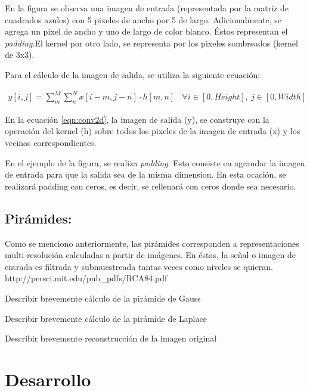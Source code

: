 \par En la figura se observa una imagen de entrada (representada por la matriz de cuadrados azules) con 5 pixeles de ancho por 5 de largo. Adicionalmente, se agrega un pixel de ancho y uno de largo de color blanco. Éstos representan el \textit{padding}.El kernel por otro lado, se representa por los pixeles sombreados (kernel de 3x3).

\par Para el cálculo de la imagen de salida, se utiliza la siguiente ecuación:

\begin{align}
  y[i,j] = \sum_{m}^{M} \sum_{n}^{N} x[i-m, j-n] \cdot h[m,n] \: \: \: \: \forall i \in [0,Height], \: j \in [0,Width]
  \label{eqn:conv2d}
\end{align}

\par En la ecuación \ref{eqn:conv2d}, la imagen de salida (y), se construye con la operación del kernel (h) sobre todos los pixeles de la imagen de entrada (x) y los vecinos correspondientes.

\par En el ejemplo de la figura, se realiza \textit{padding}. Esto consiste en agrandar la imagen de entrada para que la salida sea de la misma dimension. En esta ocación, se realizará padding con ceros, es decir, se rellenará con ceros donde sea necesario.

\subsection{Pirámides:} 
\par Como se menciono anteriormente, las pirámides corresponden a representaciones multi-resolución calculadas a partir de imágenes. En éstas, la señal o imagen de entrada es filtrada y submuestreada tantas veces como niveles se quieran.   http://persci.mit.edu/pub_pdfs/RCA84.pdf

\bigskip  
\par Describir brevemente cálculo de la pirámide de Gauss
\par Describir brevemente cálculo de la pirámide de Laplace
\par Describir brevemente reconstrucción de la imagen original


\newpage
\section{Desarrollo}
